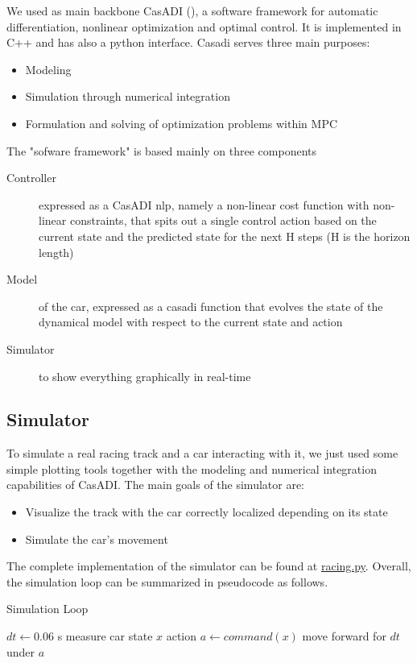 \documentclass[a4paper, onecolumn, 12pt]{article}
\begin{document}
We used as main backbone CasADI (\cite{casadi}), a software framework for automatic
differentiation, nonlinear optimization and optimal control. It is implemented
in C++ and has also a python interface. Casadi serves three main purposes:
\begin{itemize}
    \item Modeling
    \item Simulation through numerical integration
    \item Formulation and solving of optimization problems within MPC
\end{itemize}
The "sofware framework" is based mainly on three components
\begin{description}
    \item[Controller] expressed as a CasADI nlp, namely a non-linear cost
    function with non-linear constraints, that spits out a single control action
    based on the current state and the predicted state for the next H steps (H
    is the horizon length)
    \item[Model] of the car, expressed as a casadi function that evolves the
    state of the dynamical model with respect to the current state and action
    \item[Simulator] to show everything graphically in real-time
\end{description}

\subsection{Simulator}

To simulate a real racing track and a car interacting with it, we just used
some simple plotting tools together with the modeling and numerical integration
capabilities of CasADI. The main goals of the simulator are:
\begin{itemize}
    \item Visualize the track with the car correctly localized depending on its state
    \item Simulate the car's movement
\end{itemize}
The complete implementation of the simulator can be found at
\href{https://github.com/neverorfrog/vehicle-control/blob/main/simulation/racing.py}{racing.py}.
Overall, the simulation loop can be summarized in pseudocode as follows.

\begin{algorithm}
    \caption{Simulation Loop}\label{sim}
    \begin{algorithmic}[1]
        \State $dt \gets 0.06$ s 
        \State measure car state $x$
        \State action $a \gets command(x)$ 
        \State move forward for $dt$ under $a$ 
        \EndWhile
    \end{algorithmic}
\end{algorithm}
\end{document}
